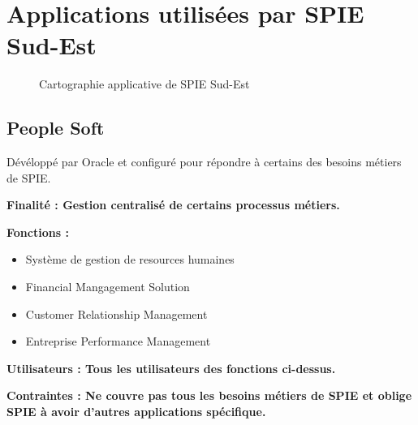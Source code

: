 \section{Applications utilisées par SPIE Sud-Est}

\begin{figure}[H]
    \label{fig-applis-spie}
    \noindent{}
    \caption{Cartographie applicative de SPIE Sud-Est}
\end{figure}

\subsection{People Soft}
Dévéloppé par Oracle et configuré pour répondre à certains des besoins métiers de SPIE.
\begin{description}
    \item \bf{Finalité :} Gestion centralisé de certains processus métiers. \\
    \item \bf{Fonctions :}
    \begin{itemize}
        \item Système de gestion de resources humaines
        \item Financial Mangagement Solution
        \item Customer Relationship Management
        \item Entreprise Performance Management \\
    \end{itemize}
    \item \bf{Utilisateurs :} Tous les utilisateurs des fonctions ci-dessus. \\
    \item \bf{Contraintes :} Ne couvre pas tous les besoins métiers de SPIE et oblige SPIE à avoir d’autres applications spécifique.
\end{description}


